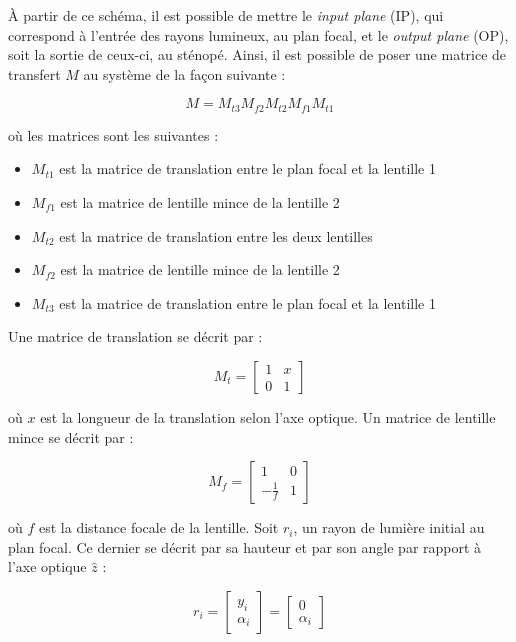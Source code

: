 \documentclass[11pt,letterpaper]{article}
\begin{document}
À partir de ce schéma, il est possible de mettre le \textit{input plane} (IP), qui correspond à l'entrée des rayons lumineux, au plan focal, et le \textit{output plane} (OP), soit la sortie de ceux-ci, au sténopé. Ainsi, il est possible de poser une matrice de transfert $M$ au système de la façon suivante :

\begin{equation}
  M = M_{t3}M_{f2}M_{t2}M_{f1}M_{t1}
\end{equation}

où les matrices sont les suivantes :

\begin{itemize}
\item $M_{t1}$ est la matrice de translation entre le plan focal et la lentille 1
\item $M_{f1}$ est la matrice de lentille mince de la lentille 2
\item $M_{t2}$ est la matrice de translation entre les deux lentilles
\item $M_{f2}$ est la matrice de lentille mince de la lentille 2
\item $M_{t3}$ est la matrice de translation entre le plan focal et la lentille 1
\end{itemize}

Une matrice de translation se décrit par :

\begin{equation}
  M_{t}= 
  \begin{bmatrix}
    1 & x \\
    0 & 1
  \end{bmatrix}
\end{equation}

où $x$ est la longueur de la translation selon l'axe optique. Un matrice de lentille mince se décrit par :

\begin{equation}
  M_{f} = 
  \begin{bmatrix}
    1 & 0 \\
    -\frac{1}{f} & 1
  \end{bmatrix}
\end{equation}

où $f$ est la distance focale de la lentille. Soit $r_i$, un rayon de lumière initial au plan focal. Ce dernier se décrit par sa hauteur et par son angle par rapport à l'axe optique $\hat{z}$ :

\begin{equation}
  r_{i}= 
  \begin{bmatrix}
    y_{i} \\
    \alpha_{i}
  \end{bmatrix}= 
  \begin{bmatrix}
    0 \\
    \alpha_{i}
  \end{bmatrix}
\end{equation}
\end{document}
